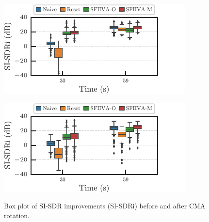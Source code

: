 \documentclass[sip,biber]{now-journal}
\begin{document}
\begin{figure}[t]
  \begin{minipage}[t]{.45\textwidth}
    \centering\includegraphics{figures/plots/online/box_980.pdf}\label{fig:plot:hist:980}
  \end{minipage}
  \begin{minipage}[t]{.45\textwidth}
    \centering\includegraphics{figures/plots/online/box_990.pdf}\label{fig:plot:hist:990}
  \end{minipage}
  \caption{Box plot of SI-SDR improvements (SI-SDRi) before and after CMA rotation.}%
  \label{fig:plot:box}
\end{figure}
\end{document}
